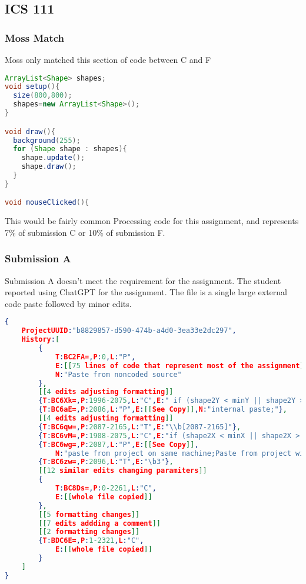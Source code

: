 \documentclass[conference]{IEEEtran}
\newcommand{\n}{\hfill\break}
\begin{document}
\subsection{\textbf{ICS 111}}
\subsubsection*{\textbf{Moss Match}}
Moss only matched this section of code between C and F
\begin{lstlisting}[language=java]
ArrayList<Shape> shapes;
void setup(){
  size(800,800);
  shapes=new ArrayList<Shape>();
}

void draw(){
  background(255);
  for (Shape shape : shapes){
    shape.update();
    shape.draw();
  }
}

void mouseClicked(){

\end{lstlisting}
This would be fairly common Processing code for this assignment, and represents 7\% of submission C or 10\% of submission F.
\subsubsection*{Submission A}
Submission A doesn't meet the requirement for the assignment.  The student reported using ChatGPT for the assignment.  The file is a single large external code paste followed by minor edits.
\begin{lstlisting}[language=json]
{
	ProjectUUID:"b8829857-d590-474b-a4d0-3ea33e2dc297",
	History:[
		{
			T:BC2FA=,P:0,L:"P",
			E:[[75 lines of code that represent most of the assignment]],
			N:"Paste from noncoded source"
		},
		[[4 edits adjusting formatting]]
		{T:BC6Xk=,P:1996-2075,L:"C",E:" if (shape2Y < minY || shape2Y > maxY - shape2Size) {\n      shape2SpeedY *= -1;"},
		{T:BC6aE=,P:2086,L:"P",E:[[See Copy]],N:"internal paste;"},
		[[4 edits adjusting formatting]]
		{T:BC6qw=,P:2087-2165,L:"T",E:"\\b[2087-2165]"},
		{T:BC6vM=,P:1908-2075,L:"C",E:"if (shape2X < minX || shape2X > maxX - shape2Size) {\n      shape2SpeedX *= -1;\n    }\n    if (shape2Y < minY || shape2Y > maxY - shape2Size) {\n      shape2SpeedY *= -1;"},
		{T:BC6wg=,P:2087,L:"P",E:[[See Copy]],
			N:"paste from project on same machine;Paste from project with UUID fragment b8829857-d590-474b-a4d0-3ea33e2dc297 10 bytes long;"},[[IDE bug, this is internal]]
		{T:BC6zw=,P:2096,L:"T",E:"\b3"},
		[[12 similar edits changing paramiters]]
		{
			T:BC8Ds=,P:0-2261,L:"C",
			E:[[whole file copied]]
		},
		[[5 formatting changes]]
		[[7 edits addding a comment]]
		[[2 formatting changes]]
		{T:BDC6E=,P:1-2321,L:"C",
			E:[[whole file copied]]
		}
	]
}

\end{lstlisting}
\end{document}
